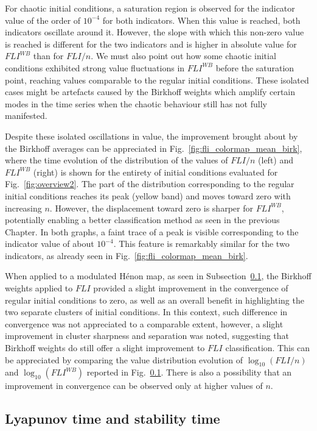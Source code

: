 For chaotic initial conditions, a saturation region is observed for the indicator value of the order of $10^{-4}$ for both indicators. When this value is reached, both indicators oscillate around it. However, the slope with which this non-zero value is reached is different for the two indicators and is higher in absolute value for $FLI^{WB}$ than for $FLI/n$. We must also point out how some chaotic initial conditions exhibited strong value fluctuations in $FLI^{WB}$ before the saturation point, reaching values comparable to the regular initial conditions. These isolated cases might be artefacts caused by the Birkhoff weights which amplify certain modes in the time series when the chaotic behaviour still has not fully manifested.

Despite these isolated oscillations in value, the improvement brought about by the Birkhoff averages can be appreciated in Fig.~\ref{fig:fli_colormap_mean_birk}, where the time evolution of the distribution of the values of $FLI/n$ (left) and $FLI^{WB}$ (right) is shown for the entirety of initial conditions evaluated for Fig.~\ref{fig:overview2}. The part of the distribution corresponding to the regular initial conditions reaches its peak (yellow band) and moves toward zero with increasing $n$. However, the displacement toward zero is sharper for $FLI^{WB}$, potentially enabling a better classification method as seen in the previous Chapter. In both graphs, a faint trace of a peak is visible corresponding to the indicator value of about $10^{-4}$. This feature is remarkably similar for the two indicators, as already seen in Fig.~\ref{fig:fli_colormap_mean_birk}.

When applied to a modulated Hénon map, as seen in Subsection~\ref{}, the Birkhoff weights applied to $FLI$ provided a slight improvement in the convergence of regular initial conditions to zero, as well as an overall benefit in highlighting the two separate clusters of initial conditions. In this context, such difference in convergence was not appreciated to a comparable extent, however, a slight improvement in cluster sharpness and separation was noted, suggesting that Birkhoff weights do still offer a slight improvement to $FLI$ classification. This can be appreciated by comparing the value distribution evolution of $\log_{10}(FLI/n)$ and $\log_{10}(FLI^{WB})$ reported in Fig.~\ref{}. There is also a possibility that an improvement in convergence can be observed only at higher values of $n$.

\subsection{Lyapunov time and stability time}

